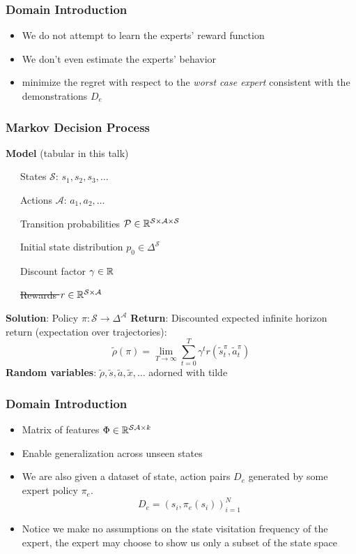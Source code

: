 \documentclass{beamer}
\begin{document}
\begin{frame}
\frametitle{Domain Introduction}
	\begin{itemize}
		\item We do not attempt to learn the experts' reward function
		\item We don't even estimate the experts' behavior
		\item minimize the regret with respect to the \emph{worst case expert} consistent with the demonstrations $D_e$
	\end{itemize}
\end{frame}

\begin{frame} \frametitle{Markov Decision Process}
  \textbf{Model} (tabular in this talk) \par
    {\small
   ~~~States $\mathcal{S}$: $s_1, s_2, s_3, \dots $ \par
   ~~~Actions $\mathcal{A}$: $a_1, a_2, \dots $ \par
   ~~~Transition probabilities $\mathcal{P} \in \mathbb{R}^{\mathcal{S} \times \mathcal{A} \times \mathcal{S} }$ \par
   ~~~Initial state distribution $p_0 \in \Delta^\mathcal{S}$ \par
   ~~~Discount factor $\gamma \in \mathbb{R}$ \par
   ~~~\sout{Rewards $r \in \mathbb{R}^{\mathcal{S} \times \mathcal{A}}$}}
    \vfill 
    \textbf{Solution}: Policy ${\pi}\colon \mathcal{S} \to \Delta^\mathcal{A}$
    \vfill
    \textbf{Return}: Discounted expected infinite horizon return (expectation over trajectories):
    \[
	    \tilde{\rho}(\pi) = \lim_{T \to \infty} \sum_{t=0}^T \gamma^t r(\tilde{s}^{\pi}_t, \tilde{a}^{{\pi}}_t)
    \]
    \vfill
    \textbf{Random variables}: $\tilde{\rho}, \tilde{s}, \tilde{a}, \tilde{x}, \dots $ adorned with tilde
\end{frame}

\begin{frame}
	\frametitle{Domain Introduction}
	\begin{itemize}
		\item Matrix of features $\Phi \in \mathbb{R}^{\mathcal{S}\mathcal{A} \times k}$
		\item Enable generalization across unseen states
		\item We are also given a dataset of state, action pairs $D_e$ generated by some expert policy $\pi_e$. \[ D_e = (s_i, \pi_e(s_i))_{i=1}^N \]
		\item Notice we make no assumptions on the state visitation frequency of the expert,
			the expert may choose to show us only a subset of the state space
	\end{itemize}
\end{frame}
\end{document}
